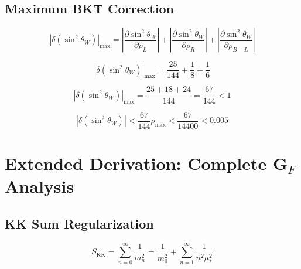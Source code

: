 \documentclass[11pt,a4paper]{article}
\theoremstyle{definition}
\begin{document}
\subsection{Maximum BKT Correction}
\label{subsec:sw2_max}

\begin{equation}
\label{eq:sw2_max_1}
|\delta(\sin^2\theta_W)|_{\max} = \left|\frac{\partial \sin^2\theta_W}{\partial \rho_L}\right| + \left|\frac{\partial \sin^2\theta_W}{\partial \rho_R}\right| + \left|\frac{\partial \sin^2\theta_W}{\partial \rho_{B-L}}\right|
\end{equation}

\begin{equation}
\label{eq:sw2_max_2}
|\delta(\sin^2\theta_W)|_{\max} = \frac{25}{144} + \frac{1}{8} + \frac{1}{6}
\end{equation}

\begin{equation}
\label{eq:sw2_max_3}
|\delta(\sin^2\theta_W)|_{\max} = \frac{25 + 18 + 24}{144} = \frac{67}{144} < 1
\end{equation}

\begin{equation}
\label{eq:sw2_max_4}
|\delta(\sin^2\theta_W)| < \frac{67}{144}\rho_{\max} < \frac{67}{14400} < 0.005
\end{equation}

\section{Extended Derivation: Complete G$_F$ Analysis}
\label{app:gf_complete}

\subsection{KK Sum Regularization}
\label{subsec:kk_reg}

\begin{equation}
\label{eq:kk_reg_1}
S_{\text{KK}} = \sum_{n=0}^{\infty}\frac{1}{m_n^2} = \frac{1}{m_0^2} + \sum_{n=1}^{\infty}\frac{1}{n^2\mu_*^2}
\end{equation}
\end{document}
